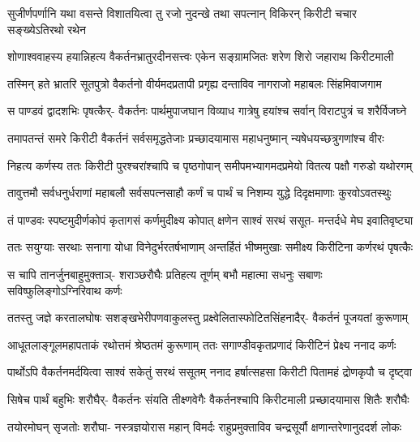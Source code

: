 \fourlineindentedshloka
{सुजीर्णपर्णानि यथा वसन्ते}
{विशातयित्वा तु रजो नुदन्खे}
{तथा सपत्नान् विकिरन् किरीटी}
{चचार सङ्ख्येऽतिरथो रथेन}


\fourlineindentedshloka
{शोणाश्ववाहस्य हयान्निहत्य}
{वैकर्तनभ्रातुरदीनसत्त्वः}
{एकेन सङ्ग्रामजितः शरेण}
{शिरो जहाराथ किरीटमाली}


\fourlineindentedshloka
{तस्मिन् हते भ्रातरि सूतपुत्रो}
{वैकर्तनो वीर्यमदप्रतापी}
{प्रगृह्य दन्ताविव नागराजो}
{महाबलः सिंहमिवाजगाम}


\fourlineindentedshloka
{स पाण्डवं द्वादशभिः पृषत्कैर्-}
{वैकर्तनः पार्थमुपाजघान}
{विव्याध गात्रेषु हयांश्च सर्वान्}
{विराटपुत्रं च शरैर्विजघ्ने}


\fourlineindentedshloka
{तमापतन्तं समरे किरीटी}
{वैकर्तनं सर्वसमृद्धतेजाः}
{प्रच्छादयामास महाधनुष्मान्}
{न्यषेधयच्छत्रुगणांश्च वीरः}


\fourlineindentedshloka
{निहत्य कर्णस्य ततः किरीटी}
{पुरश्चरांश्चापि च पृष्ठगोपान्}
{समीपमभ्यागमदप्रमेयो}
{वितत्य पक्षौ गरुडो यथोरगम्}


\fourlineindentedshloka
{तावुत्तमौ सर्वधनुर्धराणां}
{महाबलौ सर्वसपत्नसाहौ}
{कर्णं च पार्थं च निशम्य युद्धे}
{दिदृक्षमाणाः कुरवोऽवतस्थुः}


\fourlineindentedshloka
{तं पाण्डवः स्पष्टमुदीर्णकोपं}
{कृतागसं कर्णमुदीक्ष्य कोपात्}
{क्षणेन साश्वं सरथं ससूत-}
{मन्तर्दधे मेघ इवातिवृष्ट्या}


\fourlineindentedshloka
{ततः सयुग्याः सरथाः सनागा}
{योधा विनेदुर्भरतर्षभाणाम्}
{अन्तर्हितं भीष्ममुखाः समीक्ष्य}
{किरीटिना कर्णरथं पृषत्कैः}


\fourlineindentedshloka
{स चापि तानर्जुनबाहुमुक्ताञ्-}
{शराञ्छरौघैः प्रतिहत्य तूर्णम्}
{बभौ महात्मा सधनुः सबाणः}
{सविष्फुलिङ्गोऽग्निरिवाथ कर्णः}


\fourlineindentedshloka
{ततस्तु जज्ञे करतालघोषः}
{सशङ्खभेरीपणवाकुलस्तु}
{प्रक्ष्वेलितास्फोटितसिंहनादैर्-}
{वैकर्तनं पूजयतां कुरूणाम्}


\fourlineindentedshloka
{आधूतलाङ्गूलमहापताकं}
{रथोत्तमं श्रेष्ठतमं कुरूणाम्}
{ततः सगाण्डीवकृतप्रणादं}
{किरीटिनं प्रेक्ष्य ननाद कर्णः}


\fourlineindentedshloka
{पार्थोऽपि वैकर्तनमर्दयित्वा}
{साश्वं सकेतुं सरथं ससूतम्}
{ननाद हर्षात्सहसा किरीटी}
{पितामहं द्रोणकृपौ च दृष्ट्वा}


\fourlineindentedshloka
{सिषेच पार्थं बहुभिः शरौघैर्-}
{वैकर्तनः संयति तीक्ष्णवेगैः}
{वैकर्तनश्चापि किरीटमाली}
{प्रच्छादयामास शितैः शरौघैः}


\fourlineindentedshloka
{तयोरमोघन् सृजतोः शरौघा-}
{नस्त्रज्ञयोरास महान् विमर्दः}
{राहुप्रमुक्ताविव चन्द्रसूर्यौ}
{क्षणान्तरेणानुददर्श लोकः}


